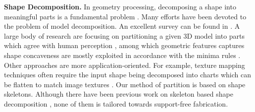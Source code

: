 \textbf{Shape Decomposition.} In geometry processing, decomposing a shape into meaningful parts is a fundamental problem \cite{Kaick:2014:SSA}. Many efforts have been devoted to the problem of model decomposition. An excellent survey can be found in \cite{Shamir08}. A large body of research are focusing on partitioning a given 3{D} model into parts which agree with human perception \cite{KatzT03,KatzLT05,JiLCW06,LiuZ07,Golovinskiy:2008,ChenGF09,KaickFKAC14}, among which geometric features captures shape concaveness are mostly exploited in accordance with the minima rules \cite{hoffman1984parts,hoffman1997salience}. Other approaches are more application-oriented. For example, texture mapping techniques often require the input shape being decomposed into charts which can be flatten to match image textures \cite{zhou2004iso,Garcia:2008:IIG}. Our method of partition is based on shape skeletons. Although there have been previous work on skeleton based shape decomposition \cite{lien2006simultaneous,reniers2007skeleton,AuTCCL08}, none of them is tailored towards support-free fabrication.


